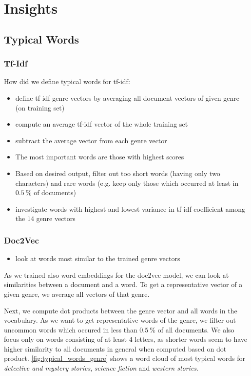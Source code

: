 \chapter{Insights}

\section{Typical Words}

\subsection{Tf-Idf}
How did we define typical words for tf-idf:
\begin{itemize}
	\item define tf-idf genre vectors by averaging all document vectors of given genre (on training set)
	\item compute an average tf-idf vector of the whole training set
	\item subtract the average vector from each genre vector
	\item The most important words are those with highest scores
	\item Based on desired output, filter out too short words (having only two characters) and rare words (e.g. keep only those which occurred at least in $0.5\ \%$ of documents)
	\item investigate words with highest and lowest variance in tf-idf coefficient among the $14$ genre vectors
\end{itemize}

\subsection{Doc2Vec}
\begin{itemize}
	\item look at words most similar to the trained genre vectors
\end{itemize}

As we trained also word embeddings for the doc2vec model, we can look at similarities between a document and a word. To get a representative vector of a given genre, we average all vectors of that genre. 

Next, we compute dot products between the genre vector and all words in the vocabulary. As we want to get representative words of the genre, we filter out uncommon words which occured in less than $0.5\ \%$ of all documents. We also focus only on words consisting of at least 4 letters, as shorter words seem to have higher similarity to all documents in general when computed based on dot product. \cref{fig:typical_words_genre} shows a word cloud of most typical words for \textit{detective and mystery stories}, \textit{science fiction} and \textit{western stories}.


